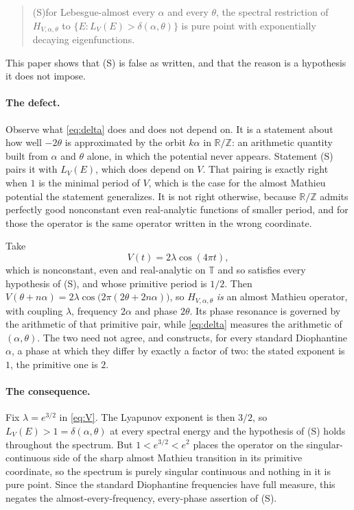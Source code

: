 \documentclass[11pt,reqno]{amsart}
\theoremstyle{plain}
\theoremstyle{definition}
\theoremstyle{remark}
\numberwithin{equation}{section}
\begin{document}
\begin{quote}
  (S)\quad for Lebesgue-almost every $\alpha$ and every $\theta$, the
  spectral restriction of $H_{V,\alpha,\theta}$ to
  $\{E:L_V(E)>\delta(\alpha,\theta)\}$ is pure point with exponentially
  decaying eigenfunctions.
\end{quote}

This paper shows that (S) is false as written, and that the reason is a
hypothesis it does not impose.

\paragraph{The defect.} Observe what \eqref{eq:delta} does and does not
depend on. It is a statement about how well $-2\theta$ is approximated by the
orbit $k\alpha$ in $\mathbb R/\mathbb Z$: an arithmetic quantity built from
$\alpha$ and $\theta$ alone, in which the potential never appears. Statement
(S) pairs it with $L_V(E)$, which does depend on $V$. That pairing is exactly
right when $1$ is the minimal period of $V$, which is the case for the almost
Mathieu potential the statement generalizes. It is not right otherwise,
because $\mathbb R/\mathbb Z$ admits perfectly good nonconstant even
real-analytic functions of smaller period, and for those the operator is the
same operator written in the wrong coordinate.

Take
\begin{equation}
  \label{eq:V}
  V(t)=2\lambda\cos(4\pi t),
\end{equation}
which is nonconstant, even and real-analytic on $\mathbb T$ and so satisfies
every hypothesis of (S), and whose primitive period is $1/2$. Then
$V(\theta+n\alpha)=2\lambda\cos\bigl(2\pi(2\theta+2n\alpha)\bigr)$, so
$H_{V,\alpha,\theta}$ \emph{is} an almost Mathieu operator, with coupling
$\lambda$, frequency $2\alpha$ and phase $2\theta$. Its phase resonance is
governed by the arithmetic of that primitive pair, while \eqref{eq:delta}
measures the arithmetic of $(\alpha,\theta)$. The two need not agree, and
 constructs, for every standard Diophantine $\alpha$, a
phase at which they differ by exactly a factor of two: the stated exponent is
$1$, the primitive one is $2$.

\paragraph{The consequence.} Fix $\lambda=e^{3/2}$ in \eqref{eq:V}. The
Lyapunov exponent is then $3/2$, so $L_V(E)>1=\delta(\alpha,\theta)$ at every
spectral energy and the hypothesis of (S) holds throughout the spectrum. But
$1<e^{3/2}<e^{2}$ places the operator on the singular-continuous side of the
sharp almost Mathieu transition in its primitive coordinate, so the spectrum
is purely singular continuous and nothing in it is pure point. Since the
standard Diophantine frequencies have full measure, this negates the
almost-every-frequency, every-phase assertion of (S).
\end{document}
